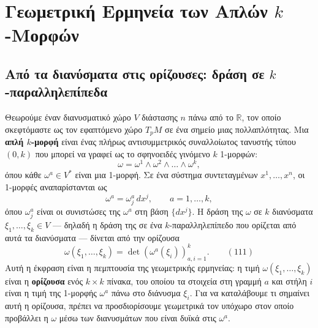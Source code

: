 \documentclass[12pt]{article}
\begin{document}
\section{Γεωμετρική Ερμηνεία των Απλών $k$-Μορφών}

\subsection{Από τα διανύσματα στις ορίζουσες: δράση σε $k$-παραλληλεπίπεδα}

Θεωρούμε έναν διανυσματικό χώρο $V$ διάστασης $n$ πάνω από το $\mathbb{R}$, τον οποίο σκεφτόμαστε ως τον εφαπτόμενο χώρο $T_pM$ σε ένα σημείο μιας πολλαπλότητας. Μια \textbf{απλή $k$-μορφή} είναι ένας πλήρως αντισυμμετρικός συναλλοίωτος τανυστής τύπου $(0,k)$ που μπορεί να γραφεί ως το σφηνοειδές γινόμενο $k$ 1-μορφών:
\[
\omega = \omega^1 \wedge \omega^2 \wedge \dots \wedge \omega^k,
\]
όπου κάθε $\omega^a \in V^*$ είναι μια 1-μορφή. Σε ένα σύστημα συντεταγμένων $x^1, \dots, x^n$, οι 1-μορφές αναπαρίστανται ως
\[
\omega^a = \omega^a_j \, dx^j, \qquad a = 1, \dots, k,
\]
όπου $\omega^a_j$ είναι οι συνιστώσες της $\omega^a$ στη βάση $\{dx^j\}$. Η δράση της $\omega$ σε $k$ διανύσματα $\xi_1, \dots, \xi_k \in V$ — δηλαδή η δράση της σε ένα $k$-παραλληλεπίπεδο που ορίζεται από αυτά τα διανύσματα — δίνεται από την ορίζουσα
\begin{equation}
\omega(\xi_1, \dots, \xi_k) = \det \left( \omega^a(\xi_i) \right)_{a,i=1}^k. \qquad (111)
\end{equation}
Αυτή η έκφραση είναι η πεμπτουσία της γεωμετρικής ερμηνείας: η τιμή $\omega(\xi_1, \dots, \xi_k)$ είναι η \textbf{ορίζουσα} ενός $k \times k$ πίνακα, του οποίου τα στοιχεία στη γραμμή $a$ και στήλη $i$ είναι η τιμή της 1-μορφής $\omega^a$ πάνω στο διάνυσμα $\xi_i$. Για να καταλάβουμε τι σημαίνει αυτή η ορίζουσα, πρέπει να προσδιορίσουμε γεωμετρικά τον υπόχωρο στον οποίο προβάλλει η $\omega$ μέσω των διανυσμάτων που είναι δυϊκά στις $\omega^a$.
\end{document}
